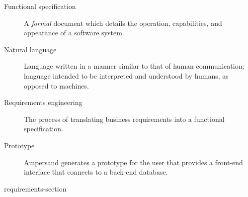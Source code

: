 \documentclass[journal,12pt,onecolumn,draftclsnofoot]{article}
\begin{document}
\begin{description}
    \item [Functional specification] A \emph{formal} document which details the 
    operation,
    capabilities, and appearance of a software system. 
    
    \item [Natural language] Language written in a manner similar to that of 
    human 
    communication; language intended to be interpreted and understood by 
    humans, as 
    opposed to machines. 
    
    \item [Requirements engineering] The process of translating business
    requirements into a functional specification. 
    
    \item [Prototype] Ampersand generates a prototype for the user that 
    provides a 
    front-end interface that connects to a back-end database.
    
\end{description}

 {requirements-section}






\newpage



\newpage

\end{document}
